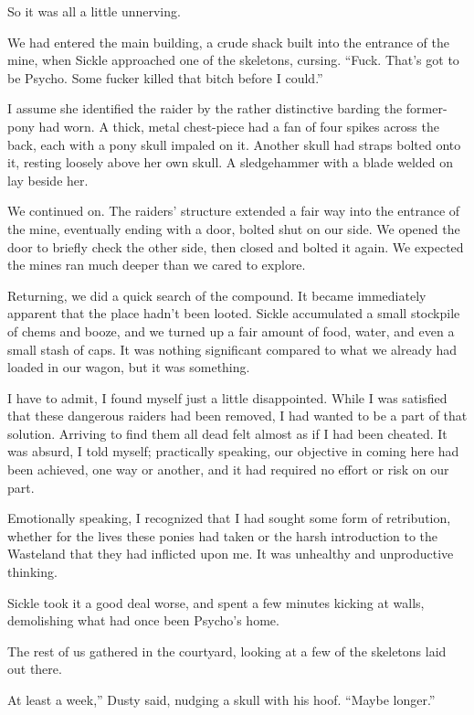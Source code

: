 So it was all a little unnerving.

We had entered the main building, a crude shack built into the entrance of the mine, when Sickle approached one of the skeletons, cursing. “Fuck. That’s got to be Psycho. Some fucker killed that bitch before I could.”

I assume she identified the raider by the rather distinctive barding the former-pony had worn. A thick, metal chest-piece had a fan of four spikes across the back, each with a pony skull impaled on it. Another skull had straps bolted onto it, resting loosely above her own skull. A sledgehammer with a blade welded on lay beside her.

We continued on. The raiders’ structure extended a fair way into the entrance of the mine, eventually ending with a door, bolted shut on our side. We opened the door to briefly check the other side, then closed and bolted it again. We expected the mines ran much deeper than we cared to explore.

Returning, we did a quick search of the compound. It became immediately apparent that the place hadn’t been looted. Sickle accumulated a small stockpile of chems and booze, and we turned up a fair amount of food, water, and even a small stash of caps. It was nothing significant compared to what we already had loaded in our wagon, but it was something.

I have to admit, I found myself just a little disappointed. While I was satisfied that these dangerous raiders had been removed, I had wanted to be a part of that solution. Arriving to find them all dead felt almost as if I had been cheated. It was absurd, I told myself; practically speaking, our objective in coming here had been achieved, one way or another, and it had required no effort or risk on our part.

Emotionally speaking, I recognized that I had sought some form of retribution, whether for the lives these ponies had taken or the harsh introduction to the Wasteland that they had inflicted upon me. It was unhealthy and unproductive thinking.

Sickle took it a good deal worse, and spent a few minutes kicking at walls, demolishing what had once been Psycho’s home.

The rest of us gathered in the courtyard, looking at a few of the skeletons laid out there.

\leavevmode{}At least a week,” Dusty said, nudging a skull with his hoof. “Maybe longer.”

